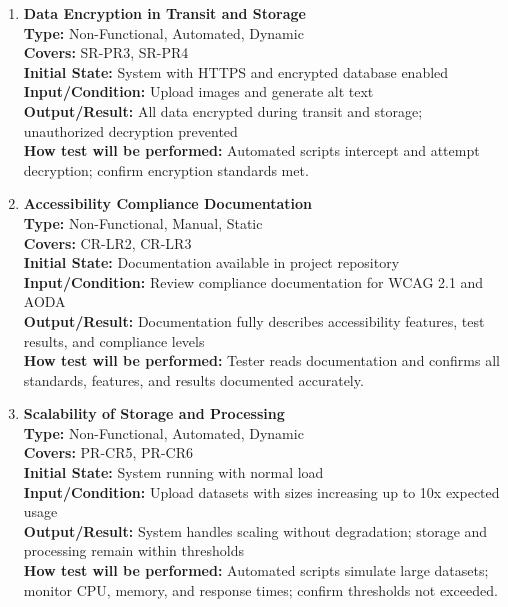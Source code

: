 \documentclass[12pt, titlepage]{article}
\begin{document}
\begin{enumerate}[label=NFR-ST \arabic*., wide=0pt, leftmargin=*]
  \item \textbf{Data Encryption in Transit and Storage} \\[2mm]
    \textbf{Type:} Non-Functional, Automated, Dynamic \\
    \textbf{Covers:} SR-PR3, SR-PR4 \\
    \textbf{Initial State:} System with HTTPS and encrypted database enabled \\
    \textbf{Input/Condition:} Upload images and generate alt text \\
    \textbf{Output/Result:} All data encrypted during transit and
    storage; unauthorized decryption prevented \\[2mm]
    \textbf{How test will be performed:} Automated scripts intercept
    and attempt decryption; confirm encryption standards met.

  \item \textbf{Accessibility Compliance Documentation} \\[2mm]
    \textbf{Type:} Non-Functional, Manual, Static \\
    \textbf{Covers:} CR-LR2, CR-LR3 \\
    \textbf{Initial State:} Documentation available in project repository \\
    \textbf{Input/Condition:} Review compliance documentation for
    WCAG 2.1 and AODA \\
    \textbf{Output/Result:} Documentation fully describes
    accessibility features, test results, and compliance levels \\[2mm]
    \textbf{How test will be performed:} Tester reads documentation
    and confirms all standards, features, and results documented accurately.

  \item \textbf{Scalability of Storage and Processing} \\[2mm]
    \textbf{Type:} Non-Functional, Automated, Dynamic \\
    \textbf{Covers:} PR-CR5, PR-CR6 \\
    \textbf{Initial State:} System running with normal load \\
    \textbf{Input/Condition:} Upload datasets with sizes increasing
    up to 10x expected usage \\
    \textbf{Output/Result:} System handles scaling without
    degradation; storage and processing remain within thresholds \\[2mm]
    \textbf{How test will be performed:} Automated scripts simulate
    large datasets; monitor CPU, memory, and response times; confirm
    thresholds not exceeded.


\end{enumerate}
\end{document}
